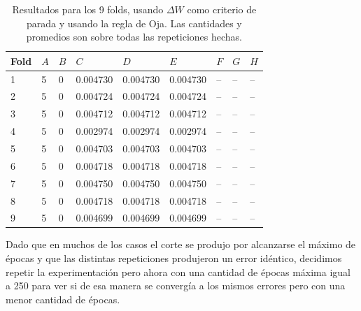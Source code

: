 \documentclass[informe.tex]{subfiles}
\begin{document}
	\begin{table}[H]
	  \centering
	  \begin{tabular}{|l|l|l|l|l|l|l|l|l|} \hline
	  Fold & $A$ & $B$ & $C$ & $D$ & $E$ & $F$ & $G$ & $H$ \\ \hline
	  1& 5 & 0 & 0.004730 & 0.004730 & 0.004730 & -- & -- & -- \\ \hline
	  2& 5 & 0 & 0.004724 & 0.004724 & 0.004724 & -- & -- & -- \\ \hline
	  3& 5 & 0 & 0.004712 & 0.004712 & 0.004712 & -- & -- & -- \\ \hline
	  4& 5 & 0 & 0.002974 & 0.002974 & 0.002974 & -- & -- & -- \\ \hline
	  5& 5 & 0 & 0.004703 & 0.004703 & 0.004703 & -- & -- & -- \\ \hline
	  6& 5 & 0 & 0.004718 & 0.004718 & 0.004718 & -- & -- & -- \\ \hline
	  7& 5 & 0 & 0.004750 & 0.004750 & 0.004750 & -- & -- & -- \\ \hline
	  8& 5 & 0 & 0.004718 & 0.004718 & 0.004718 & -- & -- & -- \\ \hline
	  9& 5 & 0 & 0.004699 & 0.004699 & 0.004699 & -- & -- & -- \\ \hline
	  \end{tabular}
	  \caption{Resultados para los 9 folds, usando $\Delta W$ como criterio de parada y usando la regla de Oja. Las cantidades y promedios son sobre todas las repeticiones hechas.}
	  \label{tab:pesos_oja500}
	\end{table}            

	
	
	
	
	Dado que en muchos de los casos el corte se produjo por alcanzarse el máximo de épocas y que las distintas repeticiones produjeron un error idéntico, decidimos repetir la experimentación pero ahora con una cantidad de épocas máxima igual a 250 para ver si de esa manera se convergía a los mismos errores pero con una menor cantidad de épocas.
	
\end{document}
